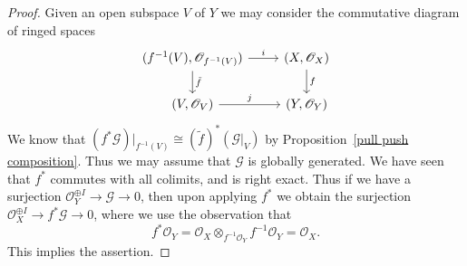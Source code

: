 \begin{proof}
Given an open subspace $V$ of $Y$ we may consider the commutative diagram
of ringed spaces
\[\begin{tikzcd}
(f^{-1}(V),\mathscr{O}_{f^{-1}(V)})\ar[r,"i"]\ar[d,"\tilde{f}"]&(X,\mathscr{O}_X)\ar[d,"f"]\\
(V,\mathscr{O}_V)\ar[r,"j"]&(Y,\mathscr{O}_Y)
\end{tikzcd}\]
We know that $(f^*\mathscr{G})|_{f^{-1}(V)}\cong(\tilde{f})^*(\mathscr{G}|_V)$ by Proposition~\ref{pull push composition}. Thus we may assume that $\mathscr{G}$ is globally generated. We have seen that $f^*$ commutes with all colimits, and is right exact. Thus if we have a surjection $\mathscr{O}_Y^{\oplus I}\to\mathscr{G}\to 0$, then upon applying $f^*$ we obtain the surjection $\mathscr{O}_X^{\oplus I}\to f^*\mathscr{G}\to 0$, where we use the observation that
\[f^*\mathscr{O}_Y=\mathscr{O}_X\otimes_{f^{-1}\mathscr{O}_Y}f^{-1}\mathscr{O}_Y=\mathscr{O}_X.\]
This implies the assertion.
\end{proof}
